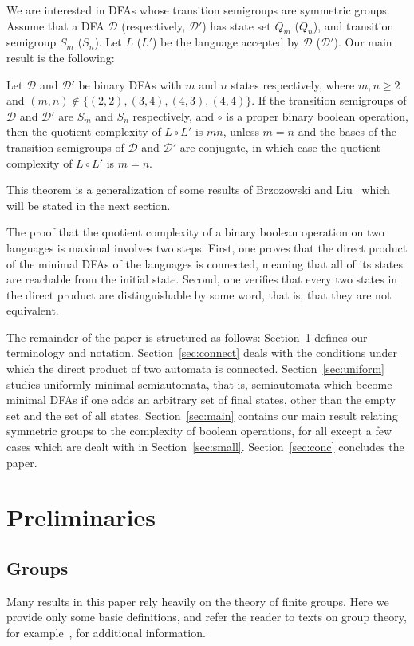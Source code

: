 \documentclass{llncs}
\newcommand{\cD}{{\mathcal D}}
\begin{document}
We are interested in DFAs whose transition semigroups are symmetric groups.
Assume that a DFA $\cD$ (respectively, $\cD'$) has state set $Q_m$ ($Q_n$), and transition semigroup $S_m$ ($S_n$).
Let $L$ ($L'$) be the language accepted by $\cD$ ($\cD'$).
Our main result is the following:
\begin{theorem}
\label{thm:main}
Let $\cD$ and $\cD'$ be binary DFAs with $m$ and $n$ states respectively, where 
$m,n\ge 2$ and $(m,n)\not \in \{(2,2),(3,4),(4,3),(4,4)\}$.
If  the transition semigroups of $\cD$ and $\cD'$ are $S_m$ and $S_n$ respectively, and $\circ$ is a proper binary boolean operation,
then the quotient complexity of $L\circ L'$ is $mn$, unless
$m=n$ and the bases of the transition semigroups of $\cD$ and $\cD'$ are conjugate, in which case the quotient complexity of $L\circ L'$ is $m=n$.
\end{theorem}


This theorem is a generalization of some results of Brzozowski and Liu~\cite{Brz12,BrLiu12} which will be stated in the next section.
\medskip

The proof that the quotient complexity of a binary boolean operation on two languages is maximal involves two steps. First, one proves that the direct product of the minimal DFAs of the languages is connected, meaning that all of its states are reachable from the initial state.
Second, one verifies that every two states in the direct product are distinguishable by some word, that is, that they are not equivalent.

The remainder of the paper is structured as follows: Section~\ref{sec:term} defines our terminology and notation. Section~\ref{sec:connect} deals with the conditions under which the direct product of two automata is connected. Section~\ref{sec:uniform} studies uniformly minimal semiautomata, that is, semiautomata which become minimal DFAs if one adds an arbitrary set of final states, other than the empty set and the set of all states. 
Section~\ref{sec:main} contains our main result relating symmetric groups to the complexity of boolean operations, for all except a few cases which are dealt with in Section~\ref{sec:small}.
Section~\ref{sec:conc} concludes the paper.

\section{Preliminaries}
\label{sec:term}

\subsection{Groups}
Many results in this paper rely heavily on the theory of finite groups. Here we provide only some basic definitions, and refer the reader to texts on group theory, for 
example~\cite{Rot65,Suz82}, for additional information.
\end{document}
